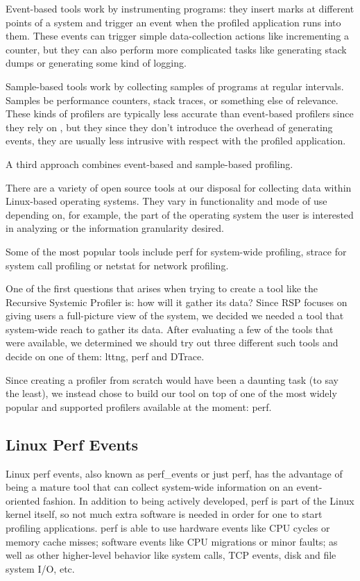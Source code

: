 \documentclass[10pt]{article}
\begin{document}
Event-based tools work by instrumenting programs: they insert marks at different points of a system and trigger an event when the profiled application runs into them. These events can trigger simple data-collection actions like incrementing a counter, but they can also perform more complicated tasks like generating stack dumps or generating some kind of logging.

Sample-based tools work by collecting samples of programs at regular intervals.  Samples be performance counters, stack traces, or something else of relevance. These kinds of profilers are typically less accurate than event-based profilers since they rely on , but they since they don't introduce the overhead of generating events, they are usually less intrusive with respect with the profiled application.

A third approach combines event-based and sample-based profiling.

There are a variety of open source tools at our disposal for collecting data within Linux-based operating systems. They vary in functionality and mode of use depending on, for example, the part of the operating system the user is interested in analyzing or the information granularity desired.

Some of the most popular tools include perf for system-wide profiling, strace for system call profiling or netstat for network profiling.

One of the first questions that arises when trying to create a tool like the Recursive Systemic Profiler is: how will it gather its data? Since RSP focuses on giving users a full-picture view of the system, we decided we needed a tool that system-wide reach to gather its data. After evaluating a few of the tools that were available, we determined we should try out three different such tools and decide on one of them: lttng, perf and DTrace.

Since creating a profiler from scratch would have been a daunting task (to say the least), we instead chose to build our tool on top of one of the most widely popular and supported profilers available at the moment: perf.

\subsection{Linux Perf Events}

Linux perf events, also known as perf\_events or just perf, has the advantage of being a mature tool that can collect system-wide information on an event-oriented fashion. In addition to being actively developed, perf is part of the Linux kernel itself, so not much extra software is needed in order for one to start profiling applications. perf is able to use hardware events like CPU cycles or memory cache misses; software events like CPU migrations or minor faults; as well as other higher-level behavior like system calls, TCP events, disk and file system I/O, etc.
\end{document}
